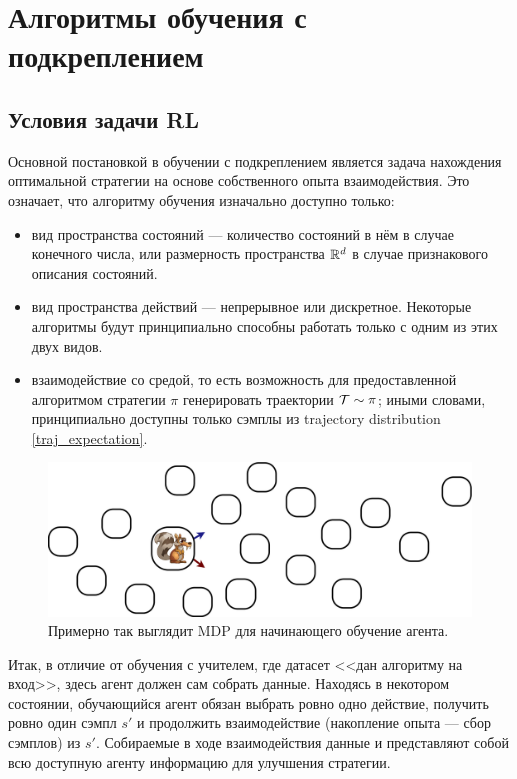 \section{Алгоритмы обучения с подкреплением}

\subsection{Условия задачи RL}

Основной постановкой в обучении с подкреплением является задача нахождения оптимальной стратегии на основе собственного опыта взаимодействия. Это означает, что алгоритму обучения изначально доступно только:
\begin{itemize}
    \item вид пространства состояний --- количество состояний в нём в случае конечного числа, или размерность пространства $\mathbb{R}^d$ в случае признакового описания состояний.
    \item вид пространства действий --- непрерывное или дискретное. Некоторые алгоритмы будут принципиально способны работать только с одним из этих двух видов.
    \item взаимодействие со средой, то есть возможность для предоставленной алгоритмом стратегии $\pi$ генерировать траектории $\mathcal{T} \sim \pi$; иными словами, принципиально доступны только сэмплы из trajectory distribution \eqref{traj_expectation}.
\end{itemize}

\begin{figure}[h]
    \centering
    \includegraphics[width=\textwidth]{Images/AgentPOV.png}
    \caption{Примерно так выглядит MDP для начинающего обучение агента.}
\end{figure}

Итак, в отличие от обучения с учителем, где датасет <<дан алгоритму на вход>>, здесь агент должен сам собрать данные. Находясь в некотором состоянии, обучающийся агент обязан выбрать ровно одно действие, получить ровно один сэмпл $s'$ и продолжить взаимодействие (накопление опыта --- сбор сэмплов) из $s'$. Собираемые в ходе взаимодействия данные и представляют собой всю доступную агенту информацию для улучшения стратегии.


